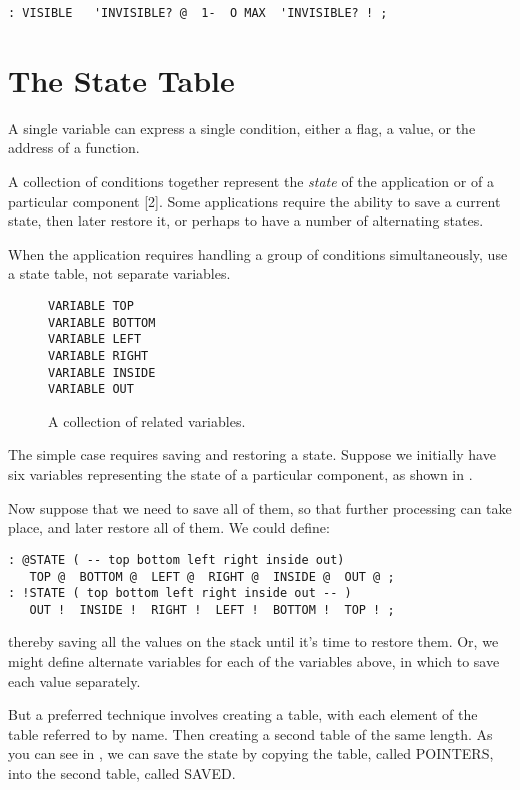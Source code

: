 \begin{verbatim}
: VISIBLE   'INVISIBLE? @  1-  O MAX  'INVISIBLE? ! ;
\end{verbatim}

\section{The State Table}

A single variable can express a single condition, either a flag, a value, or
the address of a function.

A collection of conditions together represent the \emph{state} of the
application or of a particular component [2]. Some applications require the
ability to save a current state, then later restore it, or perhaps to have a
number of alternating states.

\begin{tip}
When the application requires handling a group of conditions
simultaneously, use a state table, not separate variables.
\end{tip}
\begin{figure*}
\caption{A collection of related variables.}
\begin{center}
\begin{Verbatim}
VARIABLE TOP
VARIABLE BOTTOM
VARIABLE LEFT
VARIABLE RIGHT
VARIABLE INSIDE
VARIABLE OUT
\end{Verbatim}
\end{center}
\end{figure*}

The simple case requires saving and restoring a state. Suppose we initially
have six variables representing the state of a particular component, as
shown in .

Now suppose that we need to save all of them, so that further processing
can take place, and later restore all of them. We could define:

\begin{verbatim}
: @STATE ( -- top bottom left right inside out)
   TOP @  BOTTOM @  LEFT @  RIGHT @  INSIDE @  OUT @ ;
: !STATE ( top bottom left right inside out -- )
   OUT !  INSIDE !  RIGHT !  LEFT !  BOTTOM !  TOP ! ;
\end{verbatim}

thereby saving all the values on the stack until it's time to restore them.
Or, we might define alternate variables for each of the variables above, in
which to save each value separately.

But a preferred technique involves creating a table, with each
element of the table referred to by name. Then creating a second table of
the same length. As you can see in , we can save the state by
copying the table, called POINTERS, into the second table, called
SAVED.

